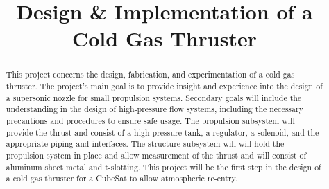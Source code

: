 \documentclass[conference]{IEEEtran} %
\title{Design \& Implementation of a Cold Gas Thruster}
\author{
  \IEEEauthorblockN{%
    James~Emerson~Parkus\IEEEauthorrefmark{1},  %
    David~Breen\IEEEauthorrefmark{2}
  }
  \IEEEauthorblockA{%
    RIT Space Exploration, Rochester Institute of Technology \\ %
    Rochester, N.Y. \\
    Email:
    \IEEEauthorrefmark{1}jep7631@rit.edu,
    \IEEEauthorrefmark{2}djb1410@rit.edu
}


}
\begin{document}
\maketitle%

\begin{abstract}
  This project concerns the design, fabrication, and experimentation of a cold gas thruster. The project's main goal is to provide insight
  and experience into the design of a supersonic nozzle for small propulsion systems. Secondary goals will include the understanding
  in the design of high-pressure flow systems, including the necessary precautions and procedures to ensure safe usage. The propulsion subsystem
  will provide the thrust and consist of a high pressure tank, a regulator, a solenoid, and the appropriate piping and interfaces. The structure subsystem will
  will hold the propulsion system in place and allow measurement of the thrust and will consist of aluminum sheet metal and t-slotting. This project will be the first
  step in the design of a cold gas thruster for a CubeSat to allow atmospheric re-entry.
\end{abstract}
\end{document}
